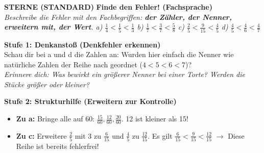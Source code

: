 \documentclass[a4paper,10pt]{article}
\newcommand{\mFrac}[2]{\frac{#1}{#2}}
\begin{document}
\begin{tcolorbox}[
    enhanced, colback=white, colframe=primaryBlue, arc=3mm, boxrule=1.2pt,
    left=4.5mm, right=4.5mm, top=2.5mm, bottom=2.5mm, height=12.9cm
]
    \begin{center}
        {\color{lvlBlue}\textbf{\faStar\faStar{} STERNE (STANDARD)}}\quad
        {\color{primaryBlue}\large\bfseries {}\quad Finde den Fehler! (Fachsprache)}\\[1mm]
        {\footnotesize\textit{Beschreibe die Fehler mit den Fachbegriffen: \textbf{der Zähler, der Nenner, erweitern mit, der Wert}.\newline
        a) $\mFrac{1}{4} < \mFrac{1}{5} < \mFrac{1}{3}$ \quad b) $\mFrac{1}{7} < \mFrac{3}{7} < \mFrac{5}{8}$ \quad c) $\mFrac{2}{5} < \mFrac{9}{15} < \mFrac{4}{5}$ \quad d) $\mFrac{4}{5} < \mFrac{4}{6} < \mFrac{4}{7}$}}
    \end{center}
    \vspace{0.5mm}

    \begin{tcolorbox}[colback=step1Bg, colframe=step1Border, arc=2mm, boxrule=0.7pt, left=3mm, right=3mm, top=1.8mm, bottom=1.8mm]
        {\color{step1Text}\bfseries\faLightbulb\enskip Stufe 1: Denkanstoß (Denkfehler erkennen)}\\[0.8mm]
        {\small
        Schau dir bei a und d die Zahlen an: Wurden hier einfach die Nenner wie natürliche Zahlen der Reihe nach geordnet ($4 < 5 < 6 < 7$)?\\
        {\color{step1Text}\faHandPointRight}\enskip \textit{Erinnere dich: Was bewirkt ein größerer Nenner bei einer Torte? Werden die Stücke größer oder kleiner?}
        }
    \end{tcolorbox}
    \vspace{0.8mm}

    \begin{tcolorbox}[colback=step2Bg, colframe=step2Border, arc=2mm, boxrule=0.7pt, left=3mm, right=3mm, top=1.8mm, bottom=1.8mm]
        {\color{step2Text}\bfseries\faSearch\enskip Stufe 2: Strukturhilfe (Erweitern zur Kontrolle)}\\[0.8mm]
        {\small
        \begin{itemize}[leftmargin=4mm, itemsep=0.2pt, topsep=1pt]
            \item \textbf{Zu a:} Bringe alle auf 60: $\mFrac{15}{60}, \mFrac{12}{60}, \mFrac{20}{60}$. 12 ist kleiner als 15!
            \item \textbf{Zu c:} Erweitere $\mFrac{2}{5}$ mit 3 zu $\mFrac{6}{15}$ und $\mFrac{4}{5}$ zu $\mFrac{12}{15}$. Es gilt $\mFrac{6}{15} < \mFrac{9}{15} < \mFrac{12}{15}$ $\rightarrow$ Diese Reihe ist bereits fehlerfrei!
        \end{itemize}
        }
    \end{tcolorbox}
    \vspace{0.8mm}


\end{tcolorbox}
\end{document}
